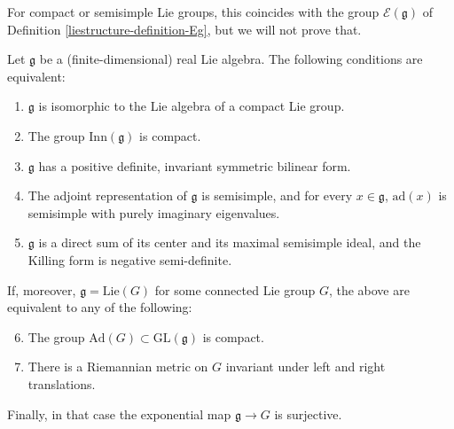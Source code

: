 For compact or semisimple Lie groups, this coincides with the group $\mathcal E(\mathfrak g)$ of Definition \ref{liestructure-definition-Eg}, but we will not prove that.



\begin{proposition}
 \label{proposition-compact-Lie}
Let $\mathfrak g$ be a (finite-dimensional) real Lie algebra. The following conditions are equivalent:
\begin{enumerate}
 \item $\mathfrak g$ is isomorphic to the Lie algebra of a compact Lie group.
 \item The group $\text{Inn}(\mathfrak g)$ is compact.
 \item $\mathfrak g$ has a positive definite, invariant symmetric bilinear form.
 \item The adjoint representation of $\mathfrak g$ is semisimple, and for every $x\in \mathfrak g$, $\text{ad}(x)$ is semisimple with purely imaginary eigenvalues.
 \item $\mathfrak g$ is a direct sum of its center and its maximal semisimple ideal, and the Killing form is negative semi-definite. 
\end{enumerate}

If, moreover, $\mathfrak g = \text{Lie}(G)$ for some connected Lie group $G$, the above are equivalent to any of the following:
\begin{enumerate}\setcounter{enumi}{5}
 \item The group $\text{Ad}(G)\subset \text{GL}(\mathfrak g)$ is compact.
 \item There is a Riemannian metric on $G$ invariant under left and right translations.
\end{enumerate}

Finally, in that case the exponential map $\mathfrak g \to G$ is surjective.
\end{proposition}

